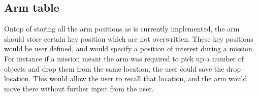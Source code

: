 \subsection{Arm table}
Ontop of storing all the arm positions as is currently implemented, the arm should store certain key position which are not overwritten. These key positions would be user defined, and would specify a position of interest during a mission. For instance if a mission meant the arm was required to pick up a number of objects and drop them from the same location, the user could save the drop location. This would allow the user to recall that location, and the arm would move there without further input from the user.





